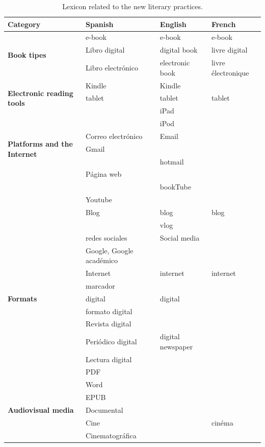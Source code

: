 \documentclass[english]{textolivre}
\begin{document}
\begin{small}
\renewcommand{\arraystretch}{1.5}
\begin{longtable}{
*{4}{l}
    }
\caption{Lexicon related to the new literary practices.}
\label{tab08}
\\
\toprule
Category & Spanish & English & French \\
\midrule
\multirow{3}{*}{\textbf{Book tipes}} & e-book & e-book & e-book \\
& Libro digital & digital book & livre digital \\
& Libro electrónico & electronic book & livre électronique \\
\multirow{3}{*}{\textbf{Electronic reading tools}} & Kindle & Kindle & \\
& tablet & tablet & tablet \\
& & iPad & \\
& & iPod& \\
\multirow{3}{*}{\textbf{Platforms and the Internet}} & Correo electrónico & Email & \\
& Gmail & & \\
& & hotmail & \\
& Página web & & \\
& & bookTube & \\
& Youtube & & \\
& Blog & blog & blog \\
& & vlog & \\
& redes sociales & Social media & \\
& Google, Google académico & & \\
& Internet & internet & internet \\
& marcador & & \\
\textbf{Formats} & digital & digital & \\
& formato digital & & \\
& Revista digital & & \\
& Periódico digital & digital newspaper & \\
& Lectura digital & & \\
& PDF & & \\
& Word & & \\
& EPUB & & \\
\textbf{Audiovisual media} & Documental & & \\
& Cine & & cinéma \\
& Cinematográfica & & \\

\end{longtable}
\end{small}
\end{document}
